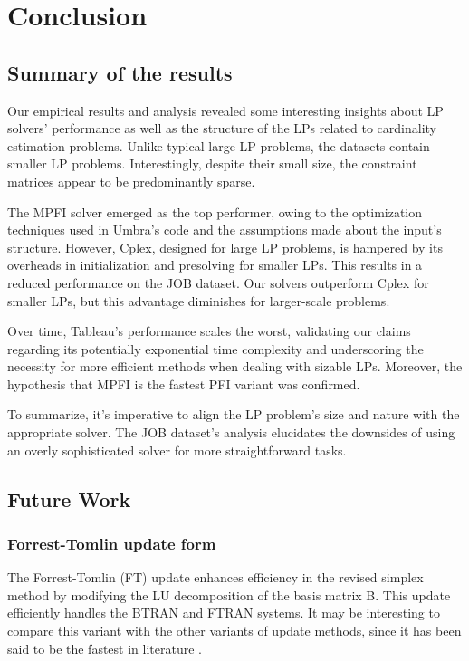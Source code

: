 
\chapter{Conclusion}\label{chapter:conclusion}
\section{Summary of the results}
Our empirical results and analysis revealed some interesting insights about LP solvers' performance as well as the structure of the LPs related to cardinality estimation problems. Unlike typical large LP problems, the datasets contain smaller LP problems. Interestingly, despite their small size, the constraint matrices appear to be predominantly sparse.

The MPFI solver emerged as the top performer, owing to the optimization techniques used in Umbra's code and the assumptions made about the input's structure. However, Cplex, designed for large LP problems, is hampered by its overheads in initialization and presolving for smaller LPs. This results in a reduced performance on the JOB dataset. Our solvers outperform Cplex for smaller LPs, but this advantage diminishes for larger-scale problems.

Over time, Tableau's performance scales the worst, validating our claims regarding its potentially exponential time complexity and underscoring the necessity for more efficient methods when dealing with sizable LPs. Moreover, the hypothesis that MPFI is the fastest PFI variant was confirmed.

To summarize, it's imperative to align the LP problem's size and nature with the appropriate solver. The JOB dataset's analysis elucidates the downsides of using an overly sophisticated solver for more straightforward tasks.

\section{Future Work}

\subsection{Forrest-Tomlin update form}
The Forrest-Tomlin (FT) update enhances efficiency in the
revised simplex method by modifying the LU decomposition of the basis matrix B.
This update efficiently handles the BTRAN and FTRAN systems. It may be interesting to compare this variant with the other variants of update methods, since it has been said to be the fastest in literature \parencite{huangfu2015novel}.